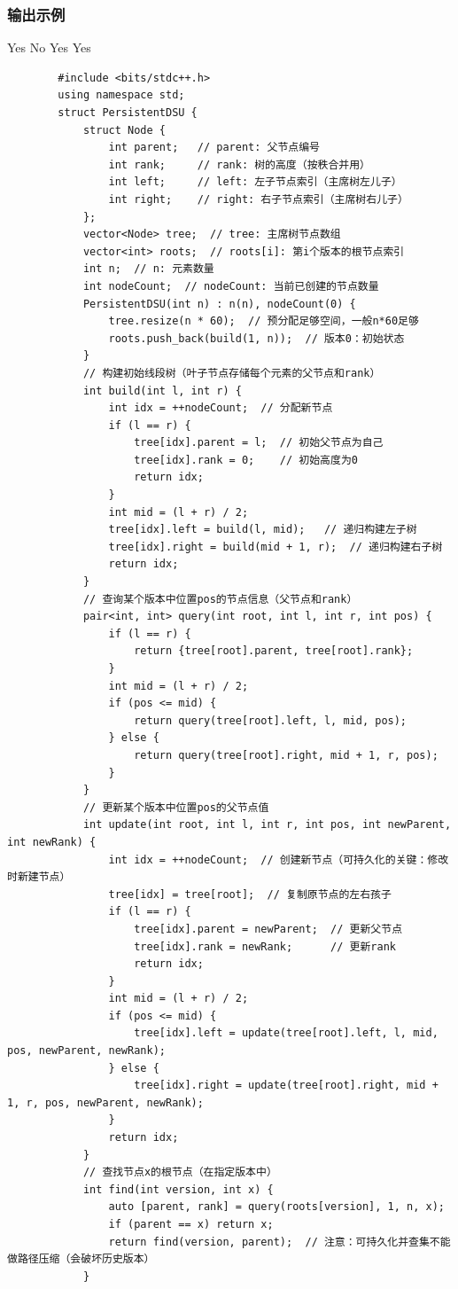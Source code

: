 \documentclass[12pt,a4paper]{ctexart}
\begin{document}
	\subsubsection*{输出示例}
	Yes
	No
	Yes
	Yes
	\begin{lstlisting}
		#include <bits/stdc++.h>
		using namespace std;
		struct PersistentDSU {
			struct Node {
				int parent;   // parent: 父节点编号
				int rank;     // rank: 树的高度（按秩合并用）
				int left;     // left: 左子节点索引（主席树左儿子）
				int right;    // right: 右子节点索引（主席树右儿子）
			};
			vector<Node> tree;  // tree: 主席树节点数组
			vector<int> roots;  // roots[i]: 第i个版本的根节点索引
			int n;  // n: 元素数量
			int nodeCount;  // nodeCount: 当前已创建的节点数量
			PersistentDSU(int n) : n(n), nodeCount(0) {
				tree.resize(n * 60);  // 预分配足够空间，一般n*60足够
				roots.push_back(build(1, n));  // 版本0：初始状态
			}
			// 构建初始线段树（叶子节点存储每个元素的父节点和rank）
			int build(int l, int r) {
				int idx = ++nodeCount;  // 分配新节点
				if (l == r) {
					tree[idx].parent = l;  // 初始父节点为自己
					tree[idx].rank = 0;    // 初始高度为0
					return idx;
				}
				int mid = (l + r) / 2;
				tree[idx].left = build(l, mid);   // 递归构建左子树
				tree[idx].right = build(mid + 1, r);  // 递归构建右子树
				return idx;
			}
			// 查询某个版本中位置pos的节点信息（父节点和rank）
			pair<int, int> query(int root, int l, int r, int pos) {
				if (l == r) {
					return {tree[root].parent, tree[root].rank};
				}
				int mid = (l + r) / 2;
				if (pos <= mid) {
					return query(tree[root].left, l, mid, pos);
				} else {
					return query(tree[root].right, mid + 1, r, pos);
				}
			}
			// 更新某个版本中位置pos的父节点值
			int update(int root, int l, int r, int pos, int newParent, int newRank) {
				int idx = ++nodeCount;  // 创建新节点（可持久化的关键：修改时新建节点）
				tree[idx] = tree[root];  // 复制原节点的左右孩子
				if (l == r) {
					tree[idx].parent = newParent;  // 更新父节点
					tree[idx].rank = newRank;      // 更新rank
					return idx;
				}
				int mid = (l + r) / 2;
				if (pos <= mid) {
					tree[idx].left = update(tree[root].left, l, mid, pos, newParent, newRank);
				} else {
					tree[idx].right = update(tree[root].right, mid + 1, r, pos, newParent, newRank);
				}
				return idx;
			}
			// 查找节点x的根节点（在指定版本中）
			int find(int version, int x) {
				auto [parent, rank] = query(roots[version], 1, n, x);
				if (parent == x) return x;
				return find(version, parent);  // 注意：可持久化并查集不能做路径压缩（会破坏历史版本）
			}

\end{lstlisting}
\end{document}
